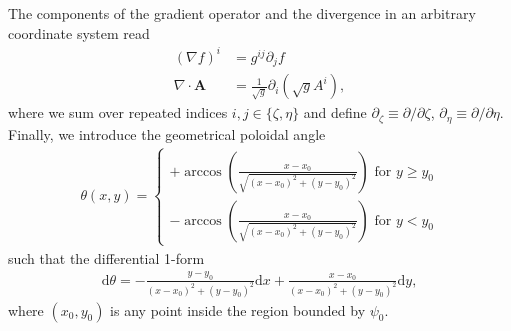 \documentclass{hitec} %
\renewcommand{\d}{\mathrm{d}}
\renewcommand{\vec}[1]{{\mathbf{#1}}}
\begin{document}
The components of the gradient operator and the divergence in an arbitrary coordinate
system read
\begin{subequations}
\begin{align}
  \left( \nabla f \right)^i &= g^{ij}\partial_j f \\
  \nabla \cdot \vec A &= \frac{1}{\sqrt g}\partial_i \left( \sqrt{g} A^i  \right),
\end{align}
  \label{eq:arbitrary}
\end{subequations}
where we sum over repeated indices $i,j\in\{\zeta,\eta\}$ and define $\partial_\zeta \equiv \partial/\partial \zeta$, $\partial_\eta \equiv \partial/\partial \eta$.
%
Finally, we introduce the 
geometrical poloidal angle 
\begin{align}
  \theta (x,y) = \begin{cases}
    +\arccos\left( \frac{x-x_0}{\sqrt{(x-x_0)^2 + (y-y_0)^2}} \right) \text{ for } y\geq y_0 \\
    -\arccos\left( \frac{x-x_0}{\sqrt{(x-x_0)^2 + (y-y_0)^2}} \right) \text{ for } y< y_0 
  \end{cases}
  \label{eq:deftheta}
\end{align}
such that the differential 1-form
\begin{align}
  \d \theta = 
    -\frac{y-y_0}{(x-x_0)^2+(y-y_0)^2} \d x
    +\frac{x-x_0}{(x-x_0)^2+(y-y_0)^2} \d y,
  \label{eq:theta}
\end{align}
where $(x_0,y_0)$ is any point inside the region bounded by $\psi_0$.
\end{document}
